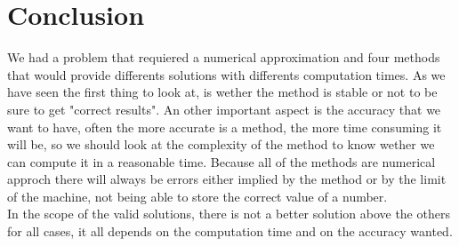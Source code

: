\documentclass[12pt, a4paper]{report}
\begin{document}
\chapter*{Conclusion}
We had a problem that requiered a numerical approximation and four methods that would provide differents solutions with differents computation times. As we have seen the first thing to look at, is wether the method is stable or not to be sure to get "correct results". An other important aspect is the accuracy that we want to have, often the more accurate is a method, the more time consuming it will be, so we should look at the complexity of the method to know wether we can compute it in a reasonable time. Because all of the methods are numerical approch there will always be errors either implied by the method or by the limit of the machine, not being able to store the correct value of a number.\\
In the scope of the valid solutions, there is not a better solution above the others for all cases, it all depends on the computation time and on the accuracy wanted.
\end{document}
